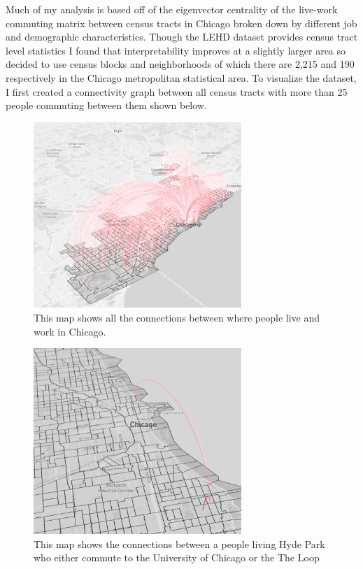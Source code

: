 \documentclass{article}
\theoremstyle{definition}
\theoremstyle{remark}
\begin{document}
Much of my analysis is based off of the eigenvector centrality of the live-work commuting matrix between census tracts in Chicago broken down by different job and demographic characteristics.  Though the LEHD dataset provides census tract level statistics I found that interpretability improves at a slightly larger area so decided to use census blocks and neighborhoods of which there are 2,215 and 190 respectively in the Chicago metropolitan statistical area.  To visualize the dataset, I first created a connectivity graph between all census tracts with more than 25 people commuting between them shown below.\\

\begin{figure}[H]
    \centering
    \includegraphics[width=0.7\textwidth]{arc-1}
    \caption{This map shows all the connections between where people live and work in Chicago.}
    \label{fig:arc-1}
\end{figure}

\begin{figure}[H]
    \centering
    \includegraphics[width=0.7\textwidth]{arc-2}
    \caption{This map shows the connections between a people living Hyde Park who either commute to the University of Chicago or the The Loop}
    \label{fig:arc-2}
\end{figure} \\
\end{document}
